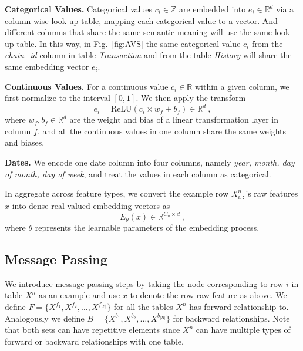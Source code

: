 \header
\textbf{Categorical Values.} 
Categorical values $c_i\in \mathbb{Z}$ are embedded into $e_i\in \mathbb{R}^{d}$ via a column-wise look-up table, mapping each categorical value to a vector. And different columns that share the same semantic meaning will use the same look-up table. In this way, in Fig.~\ref{fig:AVS} the same categorical value $c_i$ from the \textit{chain\_id} column in table \textit{Transaction} and from the table \textit{History} will share the same embedding vector $e_i$.

\header
\textbf{Continuous Values.} 
For a continuous value $c_i\in \mathbb{R}$ within a given column, we first normalize to the interval $[0, 1]$.  We then apply the transform 
\begin{equation}
    e_i = \text{ReLU}(c_i\times w_f+b_f) \in \mathbb{R}^{d}~,
\end{equation}
where $w_f, b_f\in \mathbb{R}^{d}$ are the weight and bias of a linear transformation layer in column $f$, and all the continuous values in one column share the same weights and biases.

\header
\textbf{Dates.}
We encode one date column into four columns, namely \textit{year, month, day of month, day of week}, and treat the values in each column as categorical.

\header
In aggregate across feature types, we convert the example row $X^{n}_{i,:}$'s raw features $x$ into dense real-valued embedding vectors as 
\begin{equation}
    E_{\theta}(x)\in \mathbb{R}^{C_n\times d}~,
\end{equation}
where $\theta$ represents the learnable parameters of the embedding process.

\subsection{Message Passing}\label{sec:message_passing}
We introduce message passing steps by taking the node corresponding to row $i$ in table $X^n$ as an example and use $x$ to denote the row raw feature as above. We define $F=\{X^{f_1}, X^{f_2},\ldots, X^{f_{|F|}}\}$ for all the tables $X^{n}$ has forward relationship to. Analogously we define $B=\{X^{b_1}, X^{b_2},\ldots, X^{b_{|B|}}\}$ for backward relationships. Note that both sets can have repetitive elements since $X^n$ can have multiple types of forward or backward relationships with one table.

